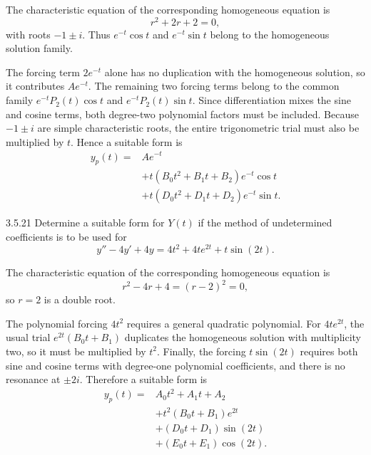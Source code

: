 \documentclass[11pt,oneside]{article}
\begin{document}
\begin{solution}
The characteristic equation of the corresponding homogeneous equation is
\[
    r^2+2r+2=0,
\]
with roots $-1\pm i$. Thus $e^{-t}\cos t$ and $e^{-t}\sin t$ belong to the homogeneous solution family.

The forcing term $2e^{-t}$ alone has no duplication with the homogeneous solution, so it contributes $Ae^{-t}$. The remaining two forcing terms belong to the common family $e^{-t}P_2(t)\cos t$ and $e^{-t}P_2(t)\sin t$. Since differentiation mixes the sine and cosine terms, both degree-two polynomial factors must be included. Because $-1\pm i$ are simple characteristic roots, the entire trigonometric trial must also be multiplied by $t$. Hence a suitable form is
\[
    \boxed{
    \begin{aligned}
        y_p(t)={}&Ae^{-t}\\
        &+t(B_0t^2+B_1t+B_2)e^{-t}\cos t\\
        &+t(D_0t^2+D_1t+D_2)e^{-t}\sin t.
    \end{aligned}}
\]
\end{solution}

\begin{problem}{3.5.21}
Determine a suitable form for $Y(t)$ if the method of undetermined coefficients is to be used for
\[
    y''-4y'+4y=4t^2+4te^{2t}+t\sin(2t).
\]
\end{problem}

\begin{solution}
The characteristic equation of the corresponding homogeneous equation is
\[
    r^2-4r+4=(r-2)^2=0,
\]
so $r=2$ is a double root.

The polynomial forcing $4t^2$ requires a general quadratic polynomial. For $4te^{2t}$, the usual trial $e^{2t}(B_0t+B_1)$ duplicates the homogeneous solution with multiplicity two, so it must be multiplied by $t^2$. Finally, the forcing $t\sin(2t)$ requires both sine and cosine terms with degree-one polynomial coefficients, and there is no resonance at $\pm2i$. Therefore a suitable form is
\[
    \boxed{
    \begin{aligned}
        y_p(t)={}&A_0t^2+A_1t+A_2\\
        &+t^2(B_0t+B_1)e^{2t}\\
        &+(D_0t+D_1)\sin(2t)\\
        &+(E_0t+E_1)\cos(2t).
    \end{aligned}}
\]
\end{solution}
\end{document}
